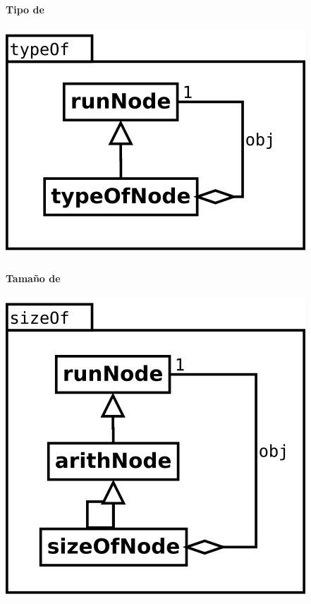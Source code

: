 \paragraph {Tipo de} 
\begin{center}
\includegraphics[scale=0.4]{typeOf.png} \\
\end{center}

\paragraph {Tamaño de} 
\begin{center}
\includegraphics[scale=0.4]{sizeOf.png} \\
\end{center}

